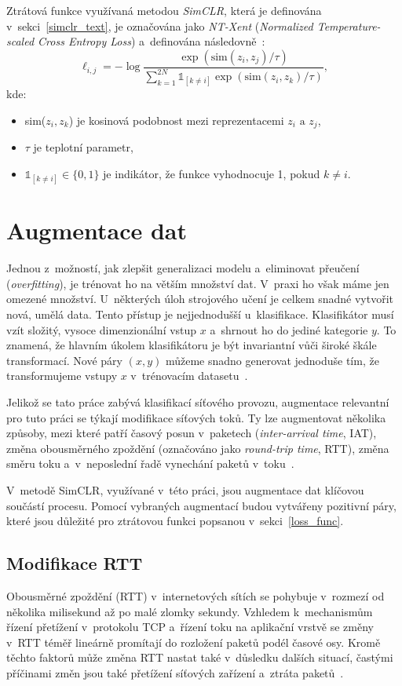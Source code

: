 Ztrátová funkce využívaná metodou \textit{SimCLR}, která je definována v~sekci~\ref{simclr_text}, je označována jako \textit{NT-Xent} (\textit{Normalized Temperature-scaled Cross Entropy Loss}) a~definována následovně~\cite{simclr}:
$$\ell_{i,j} = -\log \frac{\exp(\text{sim}(z_i, z_j) / \tau)}{\sum_{k=1}^{2N} \mathds{1}_{[k \neq i]} \exp(\text{sim}(z_i, z_k) / \tau)},$$
kde:
\begin{itemize}
    \item sim($z_{i}, z_{k}$) je kosinová podobnost mezi reprezentacemi $z_{i} \text{ a~} z_{j}$,
    \item $\tau$ je teplotní parametr,
    \item $\mathds{1}_{[k \neq i]} \in \{0,1\}$ je indikátor, že funkce vyhodnocuje 1, pokud $k \neq i$.
\end{itemize}

\section{Augmentace dat}
\label{augmentace}
Jednou z~možností, jak zlepšit generalizaci modelu a~eliminovat přeučení (\textit{overfitting}), je trénovat ho na větším množství dat. V~praxi ho však máme jen omezené množství. U~některých úloh strojového učení je celkem snadné vytvořit nová, umělá data. Tento přístup je nejjednodušší u~klasifikace. Klasifikátor musí vzít složitý, vysoce dimenzionální vstup $x$ a~shrnout ho do jediné kategorie $y$. To znamená, že hlavním úkolem klasifikátoru je být invariantní vůči široké škále transformací. Nové páry $(x, y)$ můžeme snadno generovat jednoduše tím, že transformujeme vstupy $x$ v~trénovacím datasetu~\cite{Goodfellow-et-al-2016}.

Jelikož se tato práce zabývá klasifikací síťového provozu, augmentace relevantní pro tuto práci se týkají modifikace síťových toků. Ty lze augmentovat několika způsoby, mezi které patří časový posun v~paketech (\textit{inter-arrival time}, IAT), změna obousměrného zpoždění (označováno jako \textit{round-trip time}, RTT), změna směru toku a~v~neposlední řadě vynechání paketů v~toku~\cite{flowpic_augmentations}.

V~metodě SimCLR, využívané v~této práci, jsou augmentace dat klíčovou součástí procesu. Pomocí vybraných augmentací budou vytvářeny pozitivní páry, které jsou důležité pro ztrátovou funkci popsanou v~sekci~\ref{loss_func}.

\subsection{Modifikace RTT}
Obousměrné zpoždění (RTT) v~internetových sítích se pohybuje v~rozmezí od několika milisekund až po malé zlomky sekundy. Vzhledem k~mechanismům řízení přetížení v~protokolu TCP a~řízení toku na aplikační vrstvě se změny v~RTT téměř lineárně promítají do rozložení paketů podél časové osy. Kromě těchto faktorů může změna RTT nastat také v~důsledku dalších situací, častými příčinami změn jsou také přetížení síťových zařízení a~ztráta paketů~\cite{flowpic_augmentations}. 

